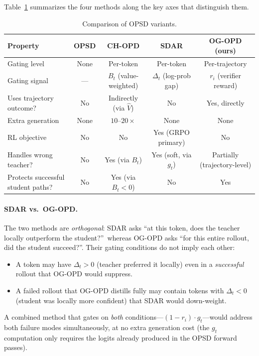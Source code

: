 \documentclass[11pt]{article}
\begin{document}
Table~\ref{tab:comparison} summarizes the four methods along the key axes that distinguish
them.

\begin{table}[h]
\centering
\caption{Comparison of OPSD variants.}
\label{tab:comparison}
\renewcommand{\arraystretch}{1.3}
\begin{tabular}{@{}lcccc@{}}
\toprule
\textbf{Property} & \textbf{OPSD} & \textbf{CH-OPD} & \textbf{SDAR} & \textbf{OG-OPD (ours)} \\
\midrule
Gating level & None & Per-token & Per-token & Per-trajectory \\
Gating signal & — & $B_t$ (value-weighted) & $\Delta_t$ (log-prob gap) & $r_i$ (verifier reward) \\
Uses trajectory outcome? & No & Indirectly (via $\hat{V}$) & No & Yes, directly \\
Extra generation & None & $10$–$20\times$ & None & None \\
RL objective & No & No & Yes (GRPO primary) & No \\
Handles wrong teacher? & No & Yes (via $B_t$) & Yes (soft, via $g_t$) & Partially (trajectory-level) \\
Protects successful student paths? & No & Yes (via $B_t < 0$) & No & Yes \\
\bottomrule
\end{tabular}
\end{table}

\paragraph{SDAR vs.\ OG-OPD.}
The two methods are \emph{orthogonal}: SDAR asks ``at this token, does the teacher
locally outperform the student?''\ whereas OG-OPD asks ``for this entire rollout, did the
student succeed?''.  Their gating conditions do not imply each other:
\begin{itemize}
  \item A token may have $\Delta_t > 0$ (teacher preferred it locally) even in a
        \emph{successful} rollout that OG-OPD would suppress.
  \item A failed rollout that OG-OPD distills fully may contain tokens with $\Delta_t < 0$
        (student was locally more confident) that SDAR would down-weight.
\end{itemize}
A combined method that gates on \emph{both} conditions—$(1-r_i) \cdot g_t$—would address
both failure modes simultaneously, at no extra generation cost (the $g_t$ computation only
requires the logits already produced in the OPSD forward passes).
\end{document}
